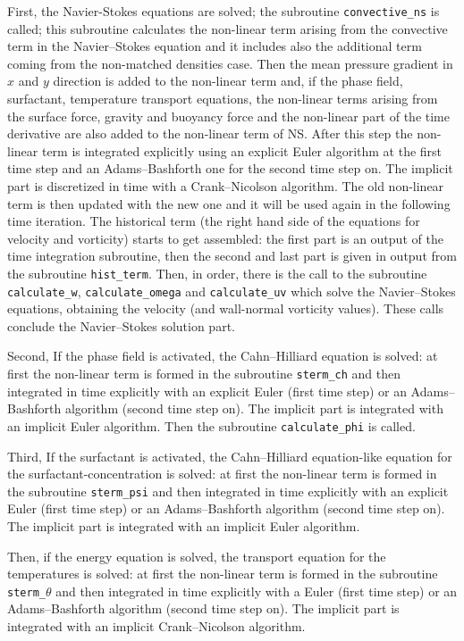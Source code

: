 First, the Navier-Stokes equations are solved; the subroutine \texttt{convective\_ns} is called; this subroutine calculates the non-linear term arising from the convective term in the Navier--Stokes equation and it includes also the additional term coming from the non-matched densities case.
Then the mean pressure gradient in $x$ and $y$ direction is added to the non-linear term and, if the phase field, surfactant, temperature transport equations, the non-linear terms arising from the surface force, gravity and buoyancy force and the non-linear part of the time derivative are also added to the non-linear term of NS.
After this step the non-linear term is integrated explicitly using an explicit Euler algorithm at the first time step and an Adams--Bashforth one for the second time step on. 
The implicit part is discretized in time with a Crank--Nicolson algorithm.
The old non-linear term is then updated with the new one and it will be used again in the following time iteration. 
The historical term (the right hand side of the equations for velocity and vorticity) starts to get assembled: the first part is an output of the time integration subroutine, then the second and last part is given in output from the subroutine \texttt{hist\_term}. 
Then, in order, there is the call to the subroutine \texttt{calculate\_w}, \texttt{calculate\_omega} and \texttt{calculate\_uv} which solve the Navier--Stokes equations, obtaining the velocity (and wall-normal vorticity values). These calls conclude the Navier--Stokes solution part.

Second, If the phase field is activated, the Cahn--Hilliard equation is solved: at first the non-linear term is formed in the subroutine \texttt{sterm\_ch} and then integrated in time explicitly with an explicit Euler (first time step) or an Adams--Bashforth algorithm (second time step on). 
The implicit part is integrated with an implicit Euler algorithm.
Then the subroutine \texttt{calculate\_phi} is called.

Third, If the surfactant is activated, the Cahn--Hilliard equation-like equation for the surfactant-concentration is solved: at first the non-linear term is formed in the subroutine \texttt{sterm\_psi} and then integrated in time explicitly with an explicit Euler (first time step) or an Adams--Bashforth algorithm (second time step on). 
The implicit part is integrated with an implicit Euler algorithm.

Then, if the energy equation is solved, the transport equation for the temperatures is solved: at first the non-linear term is formed in the subroutine \texttt{sterm\_$\theta$} and then integrated in time explicitly with a  Euler (first time step) or an Adams--Bashforth algorithm (second time step on). 
The implicit part is integrated with an implicit Crank--Nicolson algorithm.

